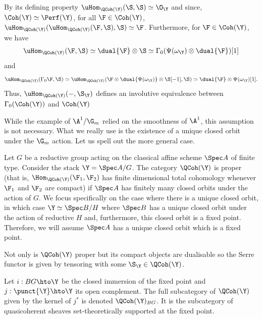 \documentclass{amsart}
\begin{document}
  \sssec{}

  By its defining property \(\uHom_{\QCoh(\Y)}(\S, \S) \simeq \O_\Y\)
  and since, \(\Coh(\Y) \simeq \Perf(\Y)\), for all \(\F \in \Coh(\Y)\),
  \(\uHom_{\QCoh(\Y)}(\uHom_{\QCoh(\Y)}(\F, \S), \S) \simeq \F\).
  Furthermore, for \(\F \in \Coh(\Y)\),
  we have
  \begin{displaymath}
    \uHom_{\QCoh(\Y)}(\F, \S) \simeq \dual{\F} \otimes \S \simeq \Gamma_0(\Psi(\omega_\Y) \otimes \dual{\F})[1]
  \end{displaymath}
  and
  \begin{displaymath}
    \uHom_{\QCoh(\Y)}(\Gamma_0\F, \S) \simeq \uHom_{\QCoh(\Y)}(\F \otimes \dual{\Psi(\omega_\Y)} \otimes \S[-1], \S) \simeq \dual{\F} \otimes \Psi(\omega_\Y)[1].
  \end{displaymath}
  Thus, \(\uHom_{\QCoh(\Y)}(-, \S_\Y)\)
  defines an involutive equivalence between
  \(\Gamma_0(\Coh(\Y))\) and \(\Coh(\Y)\)


  While the example of \(\A^1/\G_m\) relied on the smoothness of \(\A^1\),
  this assumption is not necessary. What we really use is
  the existence of a unique closed orbit under the \(\G_m\)
  action. Let us spell out the more general case.

  \sssec{}
  Let \(G\) be a reductive group acting on the classical affine scheme
  \(\Spec A\) of finite type. Consider the stack \(\Y = \Spec A/G\).
  The category \(\QCoh(\Y)\) is proper (that is,
  \(\Hom_{\QCoh(\Y)}(\F_1, \F_2)\) has finite dimensional
  total cohomology whenever \(\F_1\) and \(\F_2\) are
  compact) if \(\Spec A\) has finitely many closed orbits
  under the action of \(G\). We focus specifically
  on the case where there is a unique closed orbit,
  in which case \(\Y \simeq \Spec B/H\) where
  \(\Spec B\) has a unique closed orbit under the
  action of reductive \(H\) and, furthermore,
  this closed orbit is a fixed point.
  Therefore, we will assume \(\Spec A\) has
  a unique closed orbit which is a fixed point.

  Not only is \(\QCoh(\Y)\) proper but its compact
  objects are dualisable so the Serre functor
  is given by tensoring with some \(\S_\Y \in \QCoh(\Y)\).

  \sssec{}

  Let \(i: BG \hto \Y\) be the closed immersion of the
  fixed point and \(j: \punct{\Y} \hto \Y\) its open complement.
  The full subcategory of \(\QCoh(\Y)\) given by the kernel
  of \(j^\ast\) is denoted \(\QCoh(\Y)_{BG}\). It is
  the subcategory of quasicoherent sheaves
  set-theoretically supported at the fixed point.
\end{document}
